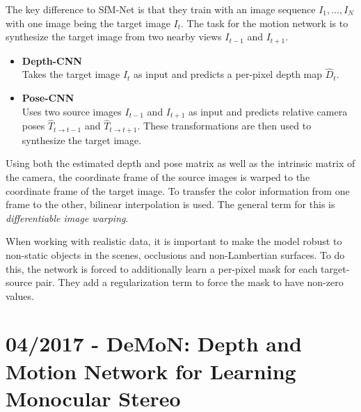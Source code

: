 		The key difference to SfM-Net is that they train with an image sequence $I_1, \dots, I_N$ with one image being the target image $I_t$.
		The task for the motion network is to synthesize the target image from two nearby views $I_{t - 1}$ and $I_{t + 1}$.
		\begin{itemize}
			\item \textbf{Depth-CNN}
				\\
				Takes the target image $I_t$ as input and predicts a per-pixel depth map $\hat{D}_t$.
			\item \textbf{Pose-CNN}
				\\
				Uses two source images $I_{t - 1}$ and $I_{t + 1}$ as input and predicts relative camera poses $\hat{T}_{t \rightarrow t - 1}$ and $\hat{T}_{t \rightarrow t + 1}$. 
				These transformations are then used to synthesize the target image.
		\end{itemize}
		Using both the estimated depth and pose matrix as well as the intrinsic matrix of the camera, the coordinate frame of the source images is warped to the coordinate frame of the target image.
		To transfer the color information from one frame to the other, bilinear interpolation is used.
		The general term for this is \emph{differentiable image warping}.
		
		When working with realistic data, it is important to make the model robust to non-static objects in the scenes, occlusions and non-Lambertian surfaces.
		To do this, the network is forced to additionally learn a per-pixel mask for each target-source pair.
		They add a regularization term to force the mask to have non-zero values.
		
	\section{04/2017 - DeMoN: Depth and Motion Network for Learning Monocular Stereo}
		
